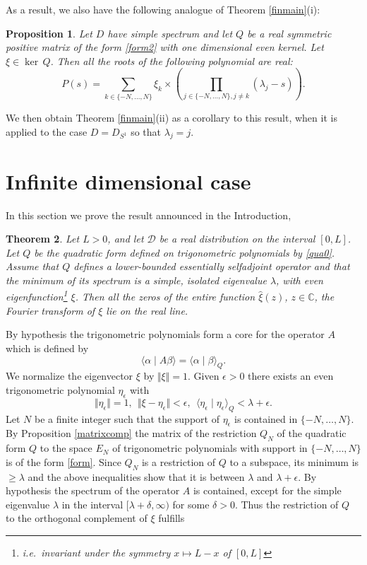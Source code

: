 \documentclass{amsart}
\newtheorem{thm}{Theorem}[section]
\newtheorem{prop}[thm]{Proposition}
\def\C{{\mathbb C}}
\def\cD{{\mathcal D}}
\newcommand{\ie}{{\it i.e.\/}\ }
\def\C{{\mathbb C}}
\def\cD{{\mathcal D}}
\begin{document}
As a result, we also have the following analogue of Theorem \ref{finmain}(i):
\begin{prop}\label{prop:finmain} Let $D$ have simple spectrum and let $Q$ be a real symmetric positive  matrix  of the form \eqref{form2} with one dimensional even kernel. Let $\xi\in \ker\, Q$. Then all the roots of the following polynomial are real:
\begin{equation}\label{proppoly}
 P(s)=\sum_{k\in\{-N,\ldots,N\}}\xi_k\times \left(\prod_{j\in\{-N,\ldots,N\}, j\neq k}(\lambda_j-s)\right).
\end{equation} 	
 \end{prop}
 We then obtain Theorem \ref{finmain}(ii) as a corollary to this result, when it is applied to the case $D= D_{S^ 1}$ so that $\lambda_j = j$.

\section{Infinite dimensional case}
In this section we prove the result announced in the Introduction, 
\begin{thm}\label{main}
Let $ L > 0 $, and let $\cD$ be a real  distribution on the interval $ [0, L] $. Let $Q$ be the quadratic form defined on trigonometric polynomials by \eqref{qua0}. Assume that $Q$ defines  a lower-bounded essentially selfadjoint operator   and that the minimum of its spectrum is a simple, isolated eigenvalue \( \lambda \), with even eigenfunction\footnote{\ie invariant under the symmetry $x\mapsto L-x$ of $[0,L]$} $\xi$. Then all the zeros of the entire function $\widehat \xi(z)$, $z\in \C$, the Fourier transform  of $\xi$ lie on the real line.
\end{thm}
\proof By hypothesis the trigonometric polynomials form a core for the operator $A$ which is defined by
$$
\langle \alpha\mid A \beta\rangle=\langle \alpha\mid \beta\rangle_Q.
$$
 We normalize the eigenvector $\xi$ by $\Vert \xi\Vert=1$.   Given $\epsilon>0$ there exists an even trigonometric polynomial $\eta_\epsilon$ with 
 \begin{equation}\label{approx}
 	\Vert \eta_\epsilon\Vert=1, \ \ \Vert\xi-\eta_\epsilon\Vert<\epsilon, \  \ \langle \eta_\epsilon\mid \eta_\epsilon\rangle_Q<\lambda+\epsilon.
 \end{equation}
 Let $N$ be a finite integer such that the support of $\eta_\epsilon$ is contained in $\{-N,\ldots,N\}$. By Proposition \ref{matrixcomp}  the matrix of the restriction $Q_N$ of the quadratic form $Q$ to the space $E_N$ of trigonometric polynomials with support  in $\{-N,\ldots,N\}$ is of the form \eqref{form}. Since $Q_N$ is a restriction of $Q$ to a subspace, its minimum is $\geq \lambda$ and the above inequalities show that it is between $\lambda$ and $\lambda+\epsilon$. By hypothesis the spectrum of the operator $A$ is contained, except for the simple eigenvalue $\lambda$ in the interval $[\lambda+\delta, \infty)$ for some $\delta>0$. Thus the restriction of $Q$ to the orthogonal complement of $\xi$ fulfills
\end{document}
